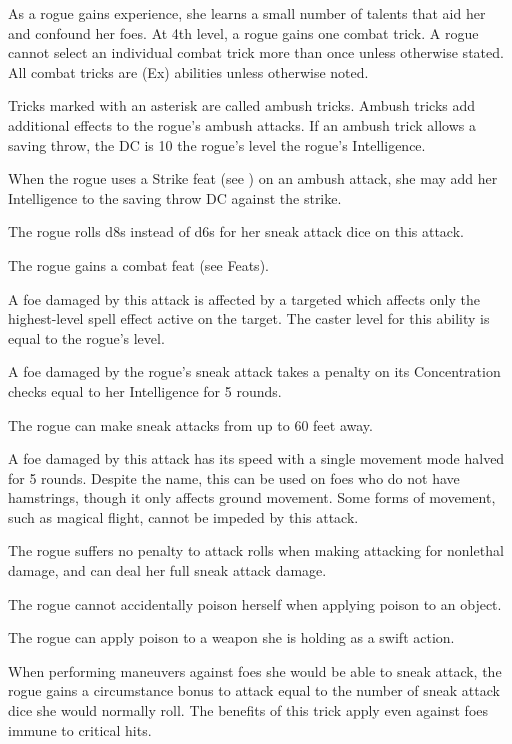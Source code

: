  As a rogue gains experience, she learns a small number of talents that aid her and confound her foes. At 4th level, a rogue gains one combat trick. A rogue cannot select an individual combat trick more than once unless otherwise stated. All combat tricks are (Ex) abilities unless otherwise noted.

\par Tricks marked with an asterisk are called ambush tricks. Ambush tricks add additional effects to the rogue's ambush attacks. If an ambush trick allows a saving throw, the DC is 10 \add the rogue's level \add the rogue's Intelligence.

 When the rogue uses a Strike feat (see ) on an ambush attack, she may add her Intelligence to the saving throw DC against the strike.

 The rogue rolls d8s instead of d6s for her sneak attack dice on this attack.

 The rogue gains a combat feat (see Feats).

 A foe damaged by this attack is affected by a targeted  which affects only the highest-level spell effect active on the target. The caster level for this ability is equal to the rogue's level.

 A foe damaged by the rogue's sneak attack takes a penalty on its Concentration checks equal to her Intelligence for 5 rounds.

 The rogue can make sneak attacks from up to 60 feet away.

 A foe damaged by this attack has its speed with a single movement mode halved for 5 rounds. Despite the name, this can be used on foes who do not have hamstrings, though it only affects ground movement. Some forms of movement, such as magical flight, cannot be impeded by this attack.

 The rogue suffers no penalty to attack rolls when making attacking for nonlethal damage, and can deal her full sneak attack damage.

 The rogue cannot accidentally poison herself when applying poison to an object.

 The rogue can apply poison to a weapon she is holding as a swift action.

 When performing maneuvers against foes she would be able to sneak attack, the rogue gains a circumstance bonus to attack equal to the number of sneak attack dice she would normally roll. The benefits of this trick apply even against foes immune to critical hits.


